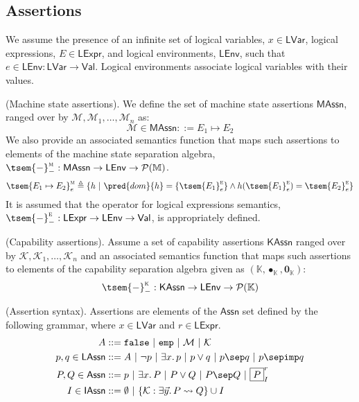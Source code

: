 \subsection{Assertions}

We assume the presence of an infinite set of logical variables, $x \in \mathsf{LVar}$, logical expressions, $E \in \mathsf{LExpr}$, and logical environments, $\mathsf{LEnv}$, such that $e \in \mathsf{LEnv} : \mathsf{LVar} \rightarrow \mathsf{Val}$. Logical environments associate logical variables with their values.

\param (Machine state assertions). We define the set of machine state assertions $\mathsf{MAssn}$, ranged over by $\mathcal{M}, \mathcal{M}_1, \ldots, \mathcal{M}_n$ as:
\[
	\mathcal{M} \in \mathsf{MAssn} ::= E_1 \mapsto E_2
\]
We also provide an associated semantics function that maps such assertions to elements of the machine state separation algebra, $\tsem{-}_-^\textsc{m} : \mathsf{MAssn} \rightarrow \mathsf{LEnv} \rightarrow \mathcal{P}(\mathbb{M})$.
\[
	\tsem{E_1 \mapsto E_2}_e^\textsc{m} \triangleq \{ h\ |\ \pred{dom}{h} = \{\tsem{E_1}_e^\textsc{e}\} \land h(\tsem{E_1}_e^\textsc{e}) = \tsem{E_2}_e^\textsc{e} \}
\]
It is assumed that the operator for logical expressions semantics, $\tsem{-}_-^\textsc{e} : \mathsf{LExpr} \rightarrow \mathsf{LEnv} \rightarrow \mathsf{Val}$, is appropriately defined.

\param (Capability assertions). Assume a set of capability assertions $\mathsf{KAssn}$ ranged over by $\mathcal{K}, \mathcal{K}_1, \ldots, \mathcal{K}_n$ and an associated semantics function that maps such assertions to elements of the capability separation algebra given as $(\mathbb{K}, \bullet_\mathbb{K}, \mathbf{0}_\mathbb{K})$:
\[
	\tsem{-}_-^\textsc{k} : \mathsf{KAssn} \rightarrow \mathsf{LEnv} \rightarrow \mathcal{P}(\mathbb{K})
\]

 (Assertion syntax). Assertions are elements of the $\mathsf{Assn}$ set defined by the following grammar, where $x \in \mathsf{LVar}$ and $r \in \mathsf{LExpr}$.
\begin{align*}
A &::= \mathtt{false}\ |\ \mathtt{emp}\ |\ \mathcal{M}\ |\ \mathcal{K} \\
p, q \in \mathsf{LAssn} &::= A\ |\ \lnot p\ |\ \exists x \ldotp p\ |\ p \lor q\ |\ p \sep q\ |\ p \sepimp q \\
P, Q \in \mathsf{Assn} &::= p\ |\ \exists x \ldotp P\ |\ P \lor Q\ |\ P \sep Q\ |\ \boxed{P}_I^r \\
I \in \mathsf{IAssn} &::= \emptyset\ |\ \{ \mathcal{K} : \exists \vec{y} \ldotp P \leadsto Q \} \cup I
\end{align*}

